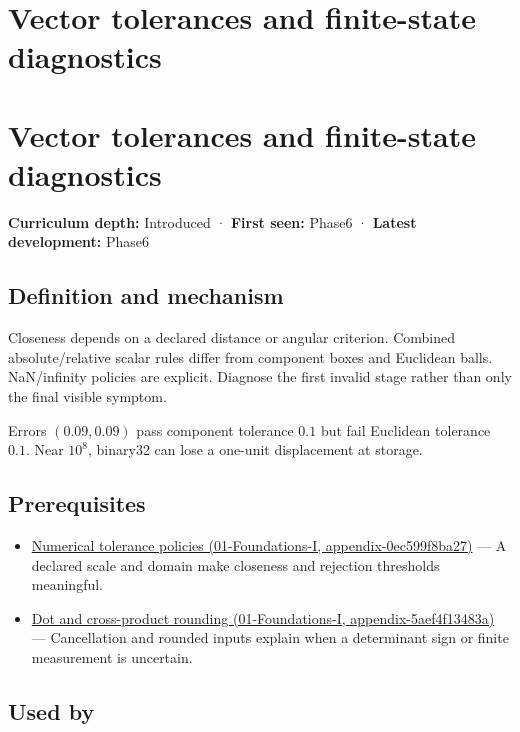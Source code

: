 \hypertarget{appendix-b5b83329215b}{}
\section*{Vector tolerances and finite-state diagnostics}
\section{Vector tolerances and finite-state diagnostics}\label{appendix-b5b83329215b-vector-tolerances-and-finite-state-diagnostics}

\textbf{Curriculum depth:} Introduced · \textbf{First seen:} Phase6 · \textbf{Latest development:} Phase6

\subsection{Definition and mechanism}\label{appendix-b5b83329215b-definition-and-mechanism}

Closeness depends on a declared distance or angular criterion. Combined absolute/relative scalar rules differ from component boxes and Euclidean balls. NaN/infinity policies are explicit. Diagnose the first invalid stage rather than only the final visible symptom.

Errors \((0.09,0.09)\) pass component tolerance \(0.1\) but fail Euclidean tolerance \(0.1\). Near \(10^8\), binary32 can lose a one-unit displacement at storage.

\subsection{Prerequisites}\label{appendix-b5b83329215b-prerequisites}

\begin{itemize}
\tightlist
\item
  \href{../01-Foundations-I/main.pdf\#nameddest=appendix-0ec599f8ba27}{Numerical tolerance policies (01-Foundations-I, appendix-0ec599f8ba27)} --- A declared scale and domain make closeness and rejection thresholds meaningful.
\item
  \href{../01-Foundations-I/main.pdf\#nameddest=appendix-5aef4f13483a}{Dot and cross-product rounding (01-Foundations-I, appendix-5aef4f13483a)} --- Cancellation and rounded inputs explain when a determinant sign or finite measurement is uncertain.
\end{itemize}

\subsection{Used by}\label{appendix-b5b83329215b-used-by}

